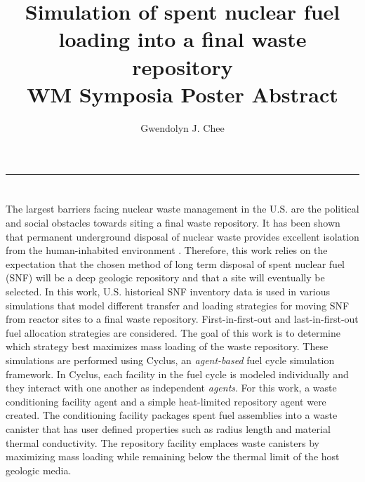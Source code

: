 \documentclass[11pt, letterpaper]{article}
\title{Simulation of spent nuclear fuel loading into a final waste repository
        \\ \vspace{0.5em} WM Symposia Poster Abstract}
\author{Gwendolyn J. Chee}
\renewcommand *\footnoterule{}
\begin{document}
	\maketitle
	\hrule

\section * {}
\doublespacing
The largest barriers facing nuclear waste management in the U.S. 
are the political and social obstacles towards siting a final 
waste repository. 
It has been shown that permanent underground disposal of nuclear 
waste provides excellent isolation from the human-inhabited 
environment \cite{rechard_evolution_2014}. 
Therefore, this work relies on the expectation that the chosen 
method of long term disposal of spent nuclear fuel (SNF) will be 
a deep geologic repository and that a site will eventually be selected.
In this work, U.S. historical SNF inventory data 
\cite{peterson_unf-st&dards_2017} is used in various simulations that model 
different transfer and loading strategies for moving SNF from reactor 
sites to a final waste repository.  
First-in-first-out and last-in-first-out fuel allocation strategies 
are considered. 
The goal of this work is to determine which strategy 
best maximizes mass loading of the waste repository. 
These simulations are performed using Cyclus, an \textit{agent-based} 
fuel cycle simulation framework. In Cyclus, each facility in 
the fuel cycle is modeled individually and they interact with one another 
as independent \textit{agents}. 
For this work, a waste conditioning facility agent 
and a simple heat-limited repository agent were created. 
The conditioning facility packages spent fuel assemblies into a waste 
canister that has user defined properties such as radius length and material 
thermal conductivity. 
The repository facility emplaces waste canisters by 
maximizing mass loading while remaining below the thermal 
limit of the host geologic media. 






\end{document}
